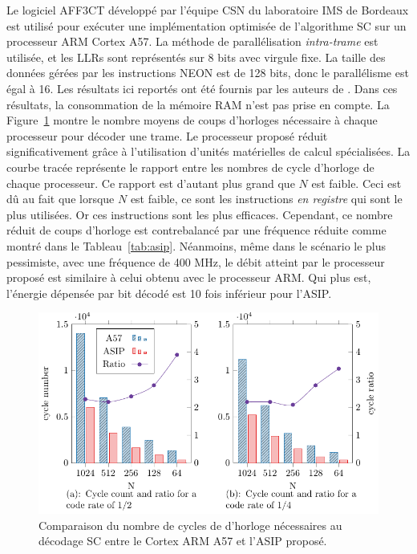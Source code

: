 Le logiciel AFF3CT développé par l'équipe CSN du laboratoire IMS de Bordeaux est utilisé pour exécuter une implémentation optimisée de l'algorithme SC sur un processeur ARM Cortex A57. La méthode de parallélisation \textit{intra-trame} est utilisée, et les LLRs sont représentés sur 8 bits avec virgule fixe. La taille des données gérées par les instructions NEON est de 128 bits, donc le parallélisme est égal à 16. Les résultats ici reportés ont été fournis par les auteurs de \cite{cassagne_energy_2016}. Dans ces résultats, la consommation de la mémoire RAM n'est pas prise en compte.
La Figure~\ref{fig:cycle_count} montre le nombre moyens de coups d'horloges nécessaire à chaque processeur pour décoder une trame. Le processeur proposé réduit significativement grâce à l'utilisation d'unités matérielles de calcul spécialisées. La courbe tracée représente le rapport entre les nombres de cycle d'horloge de chaque processeur. Ce rapport est d'autant plus grand que $N$ est faible. Ceci est dû au fait que lorsque $N$ est faible, ce sont les instructions \textit{en registre} qui sont le plus utilisées. Or ces instructions sont les plus efficaces.
Cependant, ce nombre réduit de coups d'horloge est contrebalancé par une fréquence réduite comme montré dans le Tableau~\ref{tab:asip}. Néanmoins, même dans le scénario le plus pessimiste, avec une fréquence de 400 MHz, le débit atteint par le processeur proposé est similaire à celui obtenu avec le processeur ARM. Qui plus est, l'énergie dépensée par bit décodé est 10 fois inférieur pour l'ASIP.
\begin{figure}[t]
\centering
\includegraphics{main/ch3_fig/curves/cycle_count/cycle_count}
\caption{Comparaison du nombre de cycles de d'horloge nécessaires au décodage SC entre le Cortex ARM A57 et l'ASIP proposé.}
\label{fig:cycle_count}
\end{figure}

